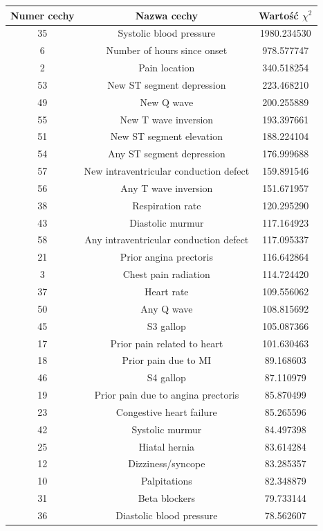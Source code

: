 \documentclass{article}
\begin{document}
\begin{center}
	\begin{longtable}{ |c|c|c| } 
		\hline
			Numer cechy & Nazwa cechy & Wartość $\chi^2$ \\
		\hline
			35 & Systolic blood pressure & 1980.234530 \\
			6 & Number of hours since onset & 978.577747 \\
			2 & Pain location & 340.518254 \\
			53 & New ST segment depression & 223.468210 \\
			49 & New Q wave & 200.255889 \\
			55 & New T wave inversion & 193.397661 \\
			51 & New ST segment elevation & 188.224104 \\
			54 & Any ST segment depression & 176.999688 \\
			57 & New intraventricular conduction defect & 159.891546 \\
			56 & Any T wave inversion & 151.671957 \\
			38 & Respiration rate & 120.295290 \\
			43 & Diastolic murmur & 117.164923 \\
			58 & Any intraventricular conduction defect & 117.095337 \\
			21 & Prior angina prectoris & 116.642864 \\
			3 & Chest pain radiation & 114.724420 \\
			37 & Heart rate & 109.556062 \\
			50 & Any Q wave & 108.815692 \\
			45 & S3 gallop & 105.087366 \\
			17 & Prior pain related to heart & 101.630463 \\
			18 & Prior pain due to MI & 89.168603 \\
			46 & S4 gallop & 87.110979 \\
			19 & Prior pain due to angina prectoris & 85.870499 \\
			23 & Congestive heart failure & 85.265596 \\
			42 & Systolic murmur & 84.497398 \\
			25 & Hiatal hernia & 83.614284 \\
			12 & Dizziness/syncope & 83.285357 \\
			10 & Palpitations & 82.348879 \\
			31 & Beta blockers & 79.733144 \\
			36 & Diastolic blood pressure & 78.562607 \\

\end{longtable}
\end{center}
\end{document}
